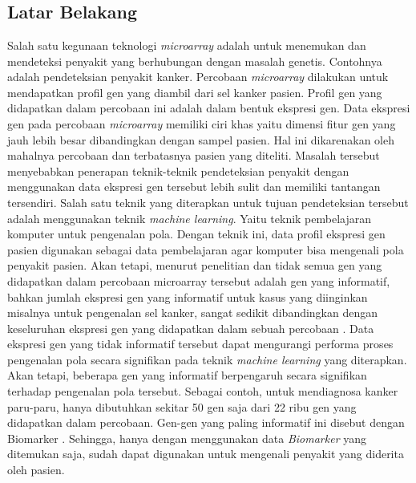 \chapter{\babSatu}

\section{Latar Belakang}
Salah satu kegunaan teknologi \textit{microarray} adalah untuk menemukan dan mendeteksi penyakit yang berhubungan dengan masalah genetis. Contohnya adalah pendeteksian penyakit kanker. Percobaan \textit{microarray} dilakukan untuk mendapatkan profil gen yang diambil dari sel kanker pasien. Profil gen yang didapatkan dalam percobaan ini adalah dalam bentuk ekspresi gen. Data ekspresi gen pada percobaan \textit{microarray} memiliki ciri khas yaitu dimensi fitur gen yang jauh lebih besar dibandingkan dengan sampel pasien. Hal ini dikarenakan oleh mahalnya percobaan dan terbatasnya pasien yang diteliti. Masalah tersebut menyebabkan penerapan teknik-teknik pendeteksian penyakit dengan menggunakan data ekspresi gen tersebut lebih sulit dan memiliki tantangan tersendiri. Salah satu teknik yang diterapkan untuk tujuan pendeteksian tersebut adalah menggunakan teknik \textit{machine learning}. Yaitu teknik pembelajaran komputer untuk pengenalan pola. Dengan teknik ini, data profil ekspresi gen pasien digunakan sebagai data pembelajaran agar komputer bisa mengenali pola penyakit pasien. Akan tetapi, menurut penelitian \cite{yoon2006building} dan \cite{bandyopadhyay2014survey} tidak semua gen yang didapatkan dalam percobaan microarray tersebut adalah gen yang informatif, bahkan jumlah ekspresi gen yang informatif untuk kasus yang diinginkan misalnya untuk pengenalan sel kanker, sangat sedikit dibandingkan dengan keseluruhan ekspresi gen yang didapatkan dalam sebuah percobaan \citep{bandyopadhyay2014survey}. Data ekspresi gen yang tidak informatif tersebut dapat mengurangi performa  proses pengenalan pola secara signifikan pada teknik \textit{machine learning} yang diterapkan. Akan tetapi, beberapa gen yang informatif berpengaruh secara signifikan terhadap pengenalan pola tersebut. Sebagai contoh, untuk mendiagnosa kanker paru-paru, hanya dibutuhkan sekitar 50 gen saja dari 22 ribu gen yang didapatkan dalam percobaan. Gen-gen yang paling informatif ini disebut dengan Biomarker \citep{belinsky2004gene}. Sehingga, hanya dengan menggunakan data \textit{Biomarker} yang ditemukan saja, sudah dapat digunakan untuk mengenali penyakit yang diderita oleh pasien.\\


